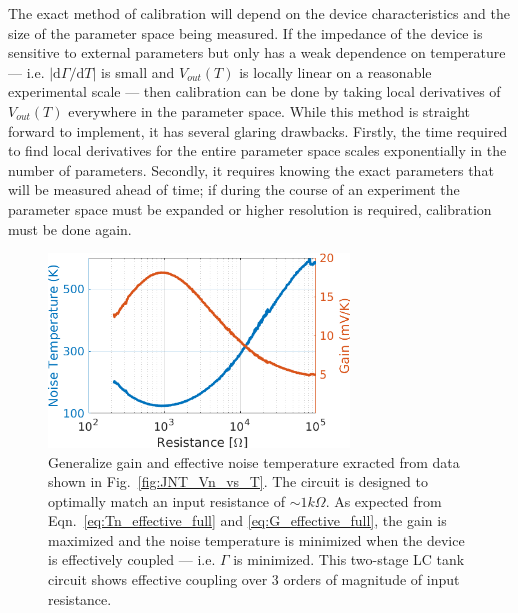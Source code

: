 The exact method of calibration will depend on the device characteristics and the size of the parameter space being measured. If the impedance of the device is sensitive to external parameters but only has a weak dependence on temperature --- i.e. $|\mathrm{d}\Gamma/\mathrm{d}T|$ is small and $V_{out}(T)$ is locally linear on a reasonable experimental scale --- then calibration can be done by taking local derivatives of $V_{out}(T)$ everywhere in the parameter space. While this method is straight forward to implement, it has several glaring drawbacks. Firstly, the time required to find local derivatives for the entire parameter space scales exponentially in the number of parameters. Secondly, it requires knowing the exact parameters that will be measured ahead of time; if during the course of an experiment the parameter space must be expanded or higher resolution is required, calibration must be done again.
\begin{figure}
\centering
\includegraphics[width = 80mm]{figures/Johnson_noise_thermometry/G_Tn_vs_R}
\caption{Generalize gain and effective noise temperature exracted from data shown in Fig.~\ref{fig:JNT_Vn_vs_T}. The circuit is designed to optimally match an input resistance of ${\sim}1k\Omega$. As expected from Eqn.~\ref{eq:Tn_effective_full} and \ref{eq:G_effective_full}, the gain is maximized and the noise temperature is minimized when the device is effectively coupled --- i.e. $\Gamma$ is minimized. This two-stage LC tank circuit shows effective coupling over $3$ orders of magnitude of input resistance.}
\label{fig:JNT_G_Tn_vs_R}
\end{figure}

